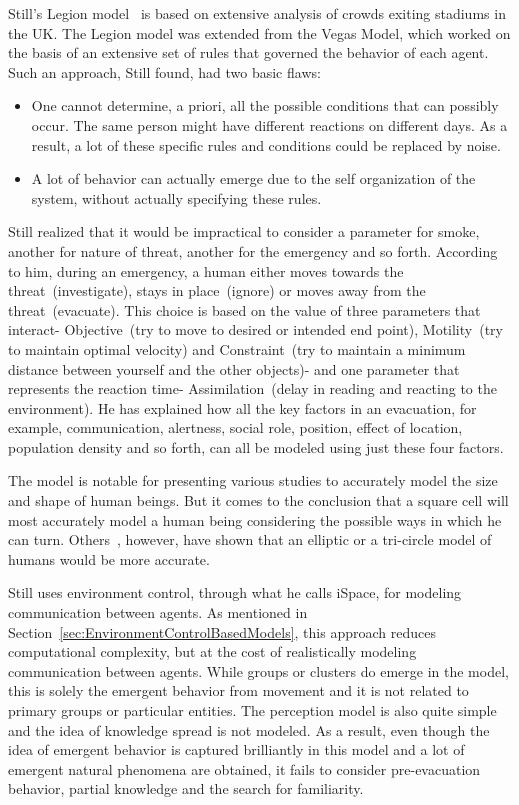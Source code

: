 Still's Legion model~\cite{Still:2000tp} is based on extensive analysis of crowds exiting stadiums in the UK. The Legion model was extended from the Vegas Model, which worked on the basis of an extensive set of rules that governed the behavior of each agent. Such an approach, Still found, had two basic flaws:
\begin{itemize}
\item One cannot determine, a priori, all the possible conditions that can possibly occur. The same person might have different reactions on different days. As a result, a lot of these specific rules and conditions could be replaced by noise.
\item A lot of behavior can actually emerge due to the self organization of the system, without actually specifying these rules.
\end{itemize}
Still realized that it would be impractical to consider a parameter for smoke, another for nature of threat, another for the emergency and so forth. According to him, during an emergency, a human either moves towards the threat~(investigate), stays in place~(ignore) or moves away from the threat~(evacuate). This choice is based on the value of three parameters that interact- Objective~(try to move to desired or intended end point), Motility~(try to maintain optimal velocity) and Constraint~(try to maintain a minimum distance between yourself and the other objects)- and one parameter that represents the reaction time- Assimilation~(delay in reading and reacting to the environment). He has explained how all the key factors in an evacuation, for example, communication, alertness, social role, position, effect of location, population density and so forth, can all be modeled using just these four factors.

The model is notable for presenting various studies to accurately model the size and shape of human beings. But it comes to the conclusion that a square cell will most accurately model a human being considering the possible ways in which he can turn. Others~\cite{Thompson:1995tm,Langston:2006kw}, however, have shown that an elliptic or a tri-circle model of humans would be more accurate.

Still uses environment control, through what he calls iSpace, for modeling communication between agents. As mentioned in Section~\ref{sec:EnvironmentControlBasedModels}, this approach reduces computational complexity, but at the cost of realistically modeling communication between agents. While groups or clusters do emerge in the model, this is solely the emergent behavior from movement and it is not related to primary groups or particular entities. The perception model is also quite simple and the idea of knowledge spread is not modeled. As a result, even though the idea of emergent behavior is captured brilliantly in this model and a lot of emergent natural phenomena are obtained, it fails to consider pre-evacuation behavior, partial knowledge and the search for familiarity.

